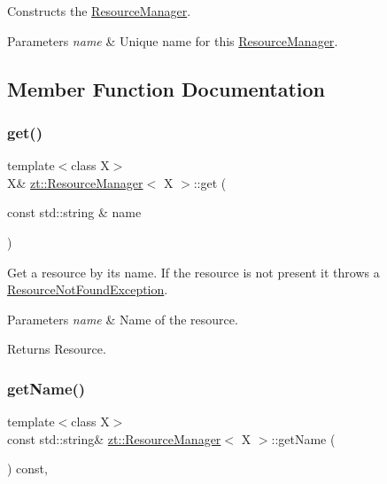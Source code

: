 Constructs the \hyperlink{classzt_1_1_resource_manager}{Resource\+Manager}. 
\begin{DoxyParams}{Parameters}
{\em name} & Unique name for this \hyperlink{classzt_1_1_resource_manager}{Resource\+Manager}. \\
\hline
\end{DoxyParams}


\subsection{Member Function Documentation}
\mbox{\label{classzt_1_1_resource_manager_a5db7d69f549152f521d3e6dc8dceab9d}} 
\subsubsection{\texorpdfstring{get()}{get()}}
{\footnotesize\ttfamily template$<$class X$>$ \\
X\& \hyperlink{classzt_1_1_resource_manager}{zt\+::\+Resource\+Manager}$<$ X $>$\+::get (\begin{DoxyParamCaption}\item[{const std\+::string \&}]{name }\end{DoxyParamCaption})\hspace{0.3cm}{\ttfamily [inline]}}

Get a resource by its name. If the resource is not present it throws a \hyperlink{classzt_1_1_resource_not_found_exception}{Resource\+Not\+Found\+Exception}. 
\begin{DoxyParams}{Parameters}
{\em name} & Name of the resource. \\
\hline
\end{DoxyParams}
\begin{DoxyReturn}{Returns}
Resource. 
\end{DoxyReturn}
\mbox{\label{classzt_1_1_resource_manager_a53eff2997bb98a45bce592be5a8cfd89}} 
\subsubsection{\texorpdfstring{get\+Name()}{getName()}}
{\footnotesize\ttfamily template$<$class X$>$ \\
const std\+::string\& \hyperlink{classzt_1_1_resource_manager}{zt\+::\+Resource\+Manager}$<$ X $>$\+::get\+Name (\begin{DoxyParamCaption}{ }\end{DoxyParamCaption}) const\hspace{0.3cm}{\ttfamily [inline]}, {\ttfamily [virtual]}}

